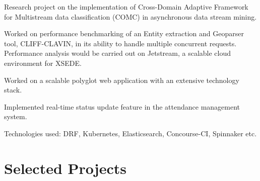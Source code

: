 \documentclass[]{deedy-resume-openfont}
\begin{document}
\begin{minipage}[t]{0.70\textwidth}
\vspace{0.1cm}
\vspace{0cm} %
\begin{tightemize}
  \item Research project on the implementation of Cross-Domain Adaptive Framework for Multistream data classification (COMC) in asynchronous data stream mining.
  \item Worked on performance benchmarking of an Entity extraction and Geoparser tool, CLIFF-CLAVIN, in its ability to handle multiple concurrent requests. Performance analysis would be carried out on Jetstream, a scalable cloud environment for XSEDE.
\end{tightemize}

\vspace{0.1cm}
\vspace{0cm} %
\begin{tightemize}
  \item Worked on a scalable polyglot web application with an extensive technology stack.
  \item Implemented real-time status update feature in the attendance management system.
  \item Technologies used: DRF, Kubernetes, Elasticsearch, Concourse-CI, Spinnaker etc.
\end{tightemize}

\section{Selected Projects}


%


\end{minipage}
\end{document}
